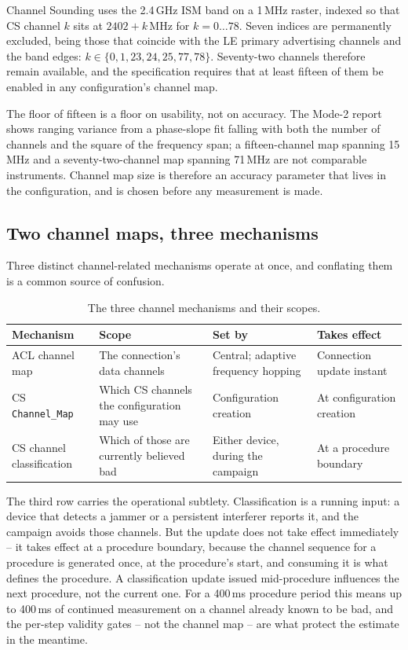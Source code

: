 \documentclass[11pt,a4paper]{article}
\newcommand{\code}[1]{\texttt{\small #1}}
\begin{document}
Channel Sounding uses the 2.4\,GHz ISM band on a 1\,MHz raster, indexed so that CS channel $k$ sits
at $2402 + k$\,MHz for $k = 0 \dots 78$. Seven indices are permanently excluded, being those that
coincide with the LE primary advertising channels and the band edges: $k \in
\{0, 1, 23, 24, 25, 77, 78\}$. Seventy-two channels therefore remain available, and the
specification requires that at least fifteen of them be enabled in any configuration's channel map.

The floor of fifteen is a floor on usability, not on accuracy. The Mode-2 report shows ranging
variance from a phase-slope fit falling with both the number of channels and the square of the
frequency span; a fifteen-channel map spanning 15\,MHz and a seventy-two-channel map spanning 71\,MHz
are not comparable instruments. Channel map size is therefore an accuracy parameter that lives in the
configuration, and is chosen before any measurement is made.

\subsection{Two channel maps, three mechanisms}

Three distinct channel-related mechanisms operate at once, and conflating them is a common source of
confusion.

\begin{table}[h]
\caption{The three channel mechanisms and their scopes.}
\label{tab:threemaps}
\centering\small
\begin{tabular}{@{}L{36mm}L{34mm}L{32mm}L{34mm}@{}}
\toprule
Mechanism & Scope & Set by & Takes effect \\
\midrule
ACL channel map & The connection's data channels & Central; adaptive frequency hopping & Connection update instant \\
CS \code{Channel\_Map} & Which CS channels the configuration may use & Configuration creation & At configuration creation \\
CS channel classification & Which of those are currently believed bad & Either device, during the campaign & At a procedure boundary \\
\bottomrule
\end{tabular}
\end{table}

The third row carries the operational subtlety. Classification is a running input: a device that
detects a jammer or a persistent interferer reports it, and the campaign avoids those channels. But
the update does not take effect immediately -- it takes effect at a procedure boundary, because the
channel sequence for a procedure is generated once, at the procedure's start, and consuming it is
what defines the procedure. A classification update issued mid-procedure influences the next
procedure, not the current one. For a 400\,ms procedure period this means up to 400\,ms of continued
measurement on a channel already known to be bad, and the per-step validity gates -- not the channel
map -- are what protect the estimate in the meantime.
\end{document}
